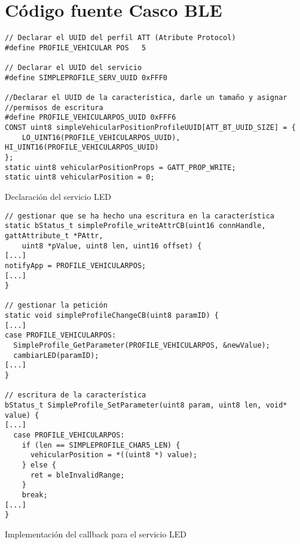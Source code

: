 \section{Código fuente Casco BLE}
\begin{listing}
\begin{minipage}{.4\textwidth}
\begin{verbatim}
// Declarar el UUID del perfil ATT (Atribute Protocol)
#define PROFILE_VEHICULAR POS   5

// Declarar el UUID del servicio
#define SIMPLEPROFILE_SERV_UUID 0xFFF0

//Declarar el UUID de la característica, darle un tamaño y asignar 
//permisos de escritura
#define PROFILE_VEHICULARPOS_UUID 0xFFF6
CONST uint8 simpleVehicularPositionProfileUUID[ATT_BT_UUID_SIZE] = {
	LO_UINT16(PROFILE_VEHICULARPOS_UUID), HI_UINT16(PROFILE_VEHICULARPOS_UUID)	
};
static uint8 vehicularPositionProps = GATT_PROP_WRITE;
static uint8 vehicularPosition = 0;

\end{verbatim}
\end{minipage}
\caption{Declaración del servicio LED}\label{alg:mota1}
\end{listing}

\begin{listing}
\begin{minipage}{.4\textwidth}
\begin{verbatim}
// gestionar que se ha hecho una escritura en la característica
static bStatus_t simpleProfile_writeAttrCB(uint16 connHandle, gattAttribute_t *PAttr,
    uint8 *pValue, uint8 len, uint16 offset) {
[...]    	
notifyApp = PROFILE_VEHICULARPOS;
[...]
}

// gestionar la petición
static void simpleProfileChangeCB(uint8 paramID) {
[...]
case PROFILE_VEHICULARPOS:
  SimpleProfile_GetParameter(PROFILE_VEHICULARPOS, &newValue);
  cambiarLED(paramID);
[...]	
}

// escritura de la característica
bStatus_t SimpleProfile_SetParameter(uint8 param, uint8 len, void* value) {
[...]	
  case PROFILE_VEHICULARPOS:
    if (len == SIMPLEPROFILE_CHAR5_LEN) {
      vehicularPosition = *((uint8 *) value);	
    } else {
      ret = bleInvalidRange;
    }
    break;
[...]
}
\end{verbatim}
\end{minipage}
\caption{Implementación del callback para el servicio LED}\label{alg:mota2}
\end{listing}